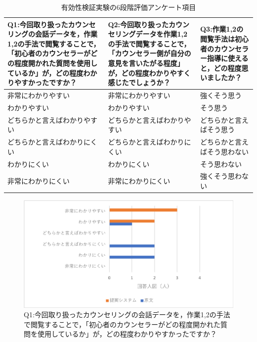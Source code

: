 \documentclass[shuuron]{kuee}
\begin{document}
\begin{table}
  \caption{有効性検証実験の6段階評価アンケート項目}
  \label{table:genbunAnke}
  \begin{center}
    \begin{tabular}{|p{4cm}|p{4cm}|p{4cm}|} \hline
      Q1:今回取り扱ったカウンセリングの会話データを，作業1,2の手法で閲覧することで，「初心者のカウンセラーがどの程度開かれた質問を使用しているか」が，どの程度わかりやすかったですか？ & Q2:今回取り扱ったカウンセリングデータを作業1,2の手法で閲覧することで，「カウンセラー側が自分の意見を言いたがる程度」が，どの程度わかりやすく感じたでしょうか？ & Q3:作業1,2の閲覧手法は初心者のカウンセラー指導に使えると，どの程度思いましたか？
      \\ \hline
       非常にわかりやすい & 非常にわかりやすい & 強くそう思う
      \\ \hline
      わかりやすい & わかりやすい & そう思う
      \\ \hline
      どちらかと言えばわかりやすい & どちらかと言えばわかりやすい & どちらかと言えばそう思う
      \\ \hline
      どちらかと言えばわかりにくい & どちらかと言えばわかりにくい & どちらかと言えばそう思わない
      \\ \hline
      わかりにくい & わかりにくい & そう思わない
      \\ \hline
      非常にわかりにくい & 非常にわかりにくい & 強くそう思わない
      \\ \hline
    \end{tabular}
  \end{center}
\end{table}

\begin{figure}
  \begin{center}
    \includegraphics[width=\linewidth]{q1.png}
  \end{center}
  \caption{Q1:今回取り扱ったカウンセリングの会話データを，作業1,2の手法で閲覧することで，「初心者のカウンセラーがどの程度開かれた質問を使用しているか」が，どの程度わかりやすかったですか？}
  \label{fig:q1}
\end{figure}
\end{document}
